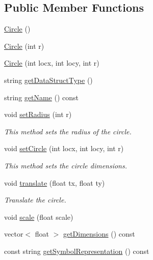 \subsection*{Public Member Functions}
\begin{DoxyCompactItemize}
\item 
\hyperlink{classbridges_1_1datastructure_1_1_circle_a2106fef85f001fbd2de2d9870a432ef8}{Circle} ()
\item 
\hyperlink{classbridges_1_1datastructure_1_1_circle_aafbf518a6d7defa3d69d46d4bdda41da}{Circle} (int r)
\item 
\hyperlink{classbridges_1_1datastructure_1_1_circle_acde4da631bd56847058a29f03417ea4e}{Circle} (int locx, int locy, int r)
\item 
string \hyperlink{classbridges_1_1datastructure_1_1_circle_a366d6a7488f926c1d63d6480fc52e791}{get\+Data\+Struct\+Type} ()
\item 
string \hyperlink{classbridges_1_1datastructure_1_1_circle_a3c7808f7918cb01ceaa3f6bf46e6bee5}{get\+Name} () const
\item 
void \hyperlink{classbridges_1_1datastructure_1_1_circle_a5b93bf688d56c7781390e6f207501313}{set\+Radius} (int r)
\begin{DoxyCompactList}\small\item\em This method sets the radius of the circle. \end{DoxyCompactList}\item 
void \hyperlink{classbridges_1_1datastructure_1_1_circle_ab9a1f6a9b76bb4e19b7f5c3e19a0f37f}{set\+Circle} (int locx, int locy, int r)
\begin{DoxyCompactList}\small\item\em This method sets the circle dimensions. \end{DoxyCompactList}\item 
void \hyperlink{classbridges_1_1datastructure_1_1_circle_ac21454141030b7c5af288ddbe2028111}{translate} (float tx, float ty)
\begin{DoxyCompactList}\small\item\em Translate the circle. \end{DoxyCompactList}\item 
void \hyperlink{classbridges_1_1datastructure_1_1_circle_a77c35a4e0a69f8ba1b71c0c40c727eab}{scale} (float scale)
\item 
vector$<$ float $>$ \hyperlink{classbridges_1_1datastructure_1_1_circle_ae70d478b0901e4c492eff1be4f01c33c}{get\+Dimensions} () const
\item 
const string \hyperlink{classbridges_1_1datastructure_1_1_circle_a796c88ccb8c5529d45aa7271a34fa3fe}{get\+Symbol\+Representation} () const
\end{DoxyCompactItemize}
